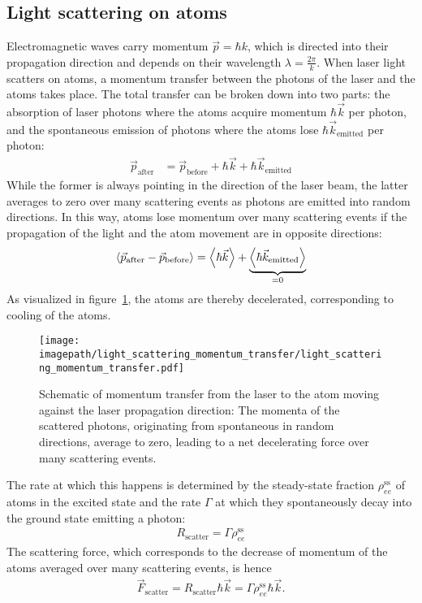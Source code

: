 \subsection*{Light scattering on atoms}
Electromagnetic waves carry momentum $\vec p = \hbar k$, which is directed into their propagation direction and depends on their wavelength $\lambda = \frac{2\pi}{k}$. When laser light scatters on atoms, a momentum transfer between the photons of the laser and the atoms takes place. The total transfer can be broken down into two parts: the absorption of laser photons where the atoms acquire momentum $\hbar \vec k$ per photon, and the spontaneous emission of photons where the atoms lose $\hbar \vec k_\text{emitted}$ per photon:
\begin{align}
    \vec p_\text{after} &= \vec p_\text{before} + \hbar \vec k + \hbar \vec k_\text{emitted}
\end{align}
While the former is always pointing in the direction of the laser beam, the latter averages to zero over many scattering events as photons are emitted into random directions. In this way, atoms lose momentum over many scattering events if the propagation of the light and the atom movement are in opposite directions:
\begin{align}
    \Braket{\vec p_\text{after} - \vec p_\text{before}} = \Braket{\hbar \vec k} + \underbrace{\Braket{\hbar \vec k_\text{emitted}}}_{=0}
\end{align}
As visualized in figure~\ref{fig:light_scattering_momentum_transfer}, the atoms are thereby decelerated, corresponding to cooling of the atoms.

\begin{figure}    
    \centering
    \texttt{[image: \\imagepath/light\_scattering\_momentum\_transfer/light\_scattering\_momentum\_transfer.pdf]}
    \caption{Schematic of momentum transfer from the laser to the atom moving against the laser propagation direction: The momenta of the scattered photons, originating from spontaneous in random directions, average to zero, leading to a net decelerating force over many scattering events.}
    \label{fig:light_scattering_momentum_transfer}
\end{figure}

The rate at which this happens is determined by the steady-state fraction $\rho_{ee}^\text{ss}$ of atoms in the excited state and the rate $\Gamma$ at which they spontaneously decay into the ground state emitting a photon:
\begin{align}
    R_\text{scatter} = \Gamma \rho_{ee}^\text{ss}
\end{align}
The scattering force, which corresponds to the decrease of momentum of the atoms averaged over many scattering events, is hence
\begin{align}
    \vec F_\text{scatter} = R_\text{scatter} \hbar \vec k = \Gamma \rho_{ee}^\text{ss} \hbar \vec k.
\end{align}

